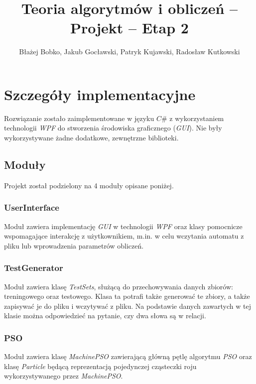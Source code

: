 \documentclass{../llncs_template/llncs}
\begin{document}
\title{Teoria algorytmów i obliczeń -- Projekt -- Etap 2}
\author{Błażej Bobko, Jakub Gocławski, Patryk Kujawski, Radosław Kutkowski}
\maketitle 

\section{Szczegóły implementacyjne}

Rozwiązanie zostało zaimplementowane w języku $C\#$ z wykorzystaniem technologii \emph{WPF} do stworzenia środowiska graficznego (\emph{GUI}). Nie były wykorzystywane żadne dodatkowe, zewnętrzne biblioteki.

\subsection{Moduły}

Projekt został podzielony na 4 moduły opisane poniżej.

\subsubsection*{UserInterface}
Moduł zawiera implementację \emph{GUI} w technologii \emph{WPF} oraz klasy pomocnicze wspomagające interakcję z użytkownikiem, m.in. w celu wczytania automatu z pliku lub wprowadzenia parametrów obliczeń.

\subsubsection*{TestGenerator}
Moduł zawiera klasę \emph{TestSets}, służącą do przechowywania danych zbiorów: treningowego oraz testowego. Klasa ta potrafi także generować te zbiory, a także zapisywać je do pliku i wczytywać z pliku. Na podstawie danych zawartych w tej klasie można odpowiedzieć na pytanie, czy dwa słowa są w relacji.

\subsubsection*{PSO}
Moduł zawiera klasę \emph{MachinePSO} zawierającą główną pętlę algorytmu \emph{PSO} oraz klasę \emph{Particle} będącą reprezentacją pojedynczej cząsteczki roju wykorzystywanego przez \emph{MachinePSO}.
\end{document}

